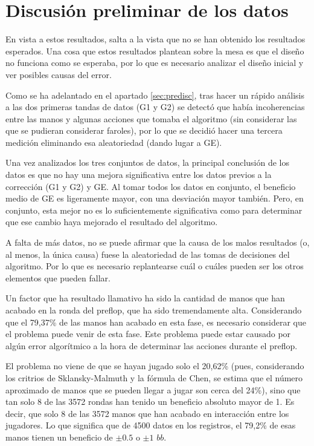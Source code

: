 \newpage

\section{Discusión preliminar de los datos}

En vista a estos resultados, salta a la vista que no se han obtenido los resultados esperados. Una cosa que estos resultados plantean sobre la mesa es que el diseño no funciona como se esperaba, por lo que es necesario analizar el diseño inicial y ver posibles causas del error.

Como se ha adelantado en el apartado \ref{sec:predisc}, tras hacer un rápido análisis a las dos primeras tandas de datos (G1 y G2) se detectó que había incoherencias entre las manos y algunas acciones que tomaba el algoritmo (sin considerar las que se pudieran considerar faroles), por lo que se decidió hacer una tercera medición eliminando esa aleatoriedad (dando lugar a GE). 

Una vez analizados los tres conjuntos de datos, la principal conclusión de los datos es que no hay una mejora significativa entre los datos previos a la corrección (G1 y G2)  y GE. Al tomar todos los datos en conjunto, el beneficio medio de GE es ligeramente mayor, con una desviación mayor también. Pero, en conjunto, esta mejor no es lo suficientemente significativa como para determinar que ese cambio haya mejorado el resultado del algoritmo.

A falta de más datos, no se puede afirmar que la causa de los malos resultados (o, al menos, la única causa) fuese la aleatoriedad de las tomas de decisiones del algoritmo. Por lo que es necesario replantearse cuál o cuáles pueden ser los otros elementos que pueden fallar.

Un factor que ha resultado llamativo ha sido la cantidad de manos que han acabado en la ronda del preflop, que ha sido tremendamente alta. Considerando que el 79,37\% de las manos han acabado en esta fase, es necesario considerar que el problema puede venir de esta fase. Este problema puede estar causado por algún error algorítmico a la hora de determinar las acciones durante el preflop.

 El problema no viene de que se hayan jugado solo el 20,62\% (pues, considerando los critrios de Sklansky-Malmuth y la fórmula de Chen, se estima que el número aproximado de manos que se pueden llegar a jugar son cerca del 24\%), sino que tan solo 8 de las 3572 rondas han tenido un beneficio absoluto mayor de 1. Es decir, que solo 8 de las 3572 manos que han acabado en interacción entre los jugadores. Lo que significa que de 4500 datos en los registros, el 79,2\% de esas manos tienen un beneficio de $\pm0.5$ o $\pm1$ $bb$.

